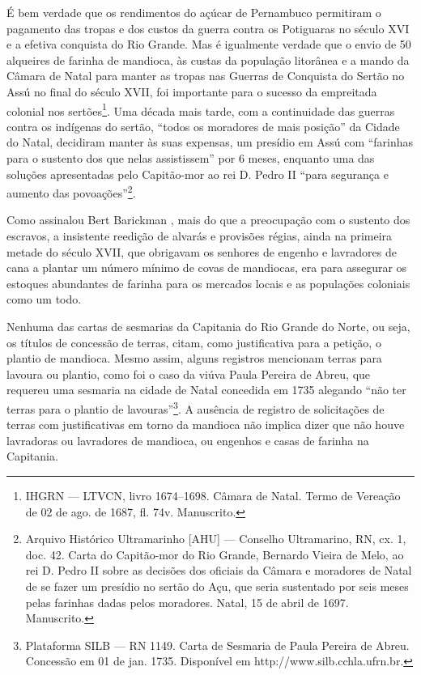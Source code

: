 \begin{refsection}
É bem verdade que os rendimentos do açúcar de Pernambuco permitiram o pagamento das tropas e dos custos da guerra contra os Potiguaras no século XVI e a efetiva conquista do Rio Grande. Mas é igualmente verdade que o envio de 50 alqueires de farinha de mandioca, às custas da população litorânea e a mando da Câmara de Natal para manter as tropas nas Guerras de Conquista do Sertão no Assú no final do século XVII, foi importante para o sucesso da empreitada colonial nos sertões\footnote{IHGRN --- LTVCN, livro 1674--1698. Câmara de Natal. Termo de Vereação de 02 de ago. de 1687, fl. 74v. Manuscrito.}. Uma década mais tarde, com a continuidade das guerras contra os indígenas do sertão, “todos os moradores de mais posição” da Cidade do Natal, decidiram manter às suas expensas, um presídio em Assú com “farinhas para o sustento dos que nelas assistissem” por 6 meses, enquanto uma das soluções apresentadas pelo Capitão-mor ao rei D. Pedro II “para segurança e aumento das povoações”\footnote{Arquivo Histórico Ultramarinho [AHU] --- Conselho Ultramarino, RN, cx. 1, doc. 42. Carta do Capitão-mor do Rio Grande, Bernardo Vieira de Melo, ao rei D. Pedro II sobre as decisões dos oficiais da Câmara e moradores de Natal de se fazer um presídio no sertão do Açu, que seria sustentado por seis meses pelas farinhas dadas pelos moradores. Natal, 15 de abril de 1697. Manuscrito.}.

Como assinalou Bert Barickman \citeyear{Barickman2003acucar}, mais do que a preocupação com o sustento dos escravos, a insistente reedição de alvarás e provisões régias, ainda na primeira metade do século XVII, que obrigavam os senhores de engenho e lavradores de cana a plantar um número mínimo de covas de mandiocas, era para assegurar os estoques abundantes de farinha para os mercados locais e as populações coloniais como um todo. 

Nenhuma das cartas de sesmarias da Capitania do Rio Grande do Norte, ou seja, os títulos de concessão de terras, citam, como justificativa para a petição, o plantio de mandioca. Mesmo assim, alguns registros mencionam terras para lavoura ou plantio, como foi o caso da viúva Paula Pereira de Abreu, que requereu uma sesmaria na cidade de Natal concedida em 1735 alegando “não ter terras para o plantio de lavouras”\footnote{Plataforma SILB --- RN 1149. Carta de Sesmaria de Paula Pereira de Abreu. Concessão em 01 de jan. 1735. Disponível em http://www.silb.cchla.ufrn.br.}. A ausência de registro de solicitações de terras com justificativas em torno da mandioca não implica dizer que não houve lavradoras ou lavradores de mandioca, ou engenhos e casas de farinha na Capitania.  


\end{refsection}
